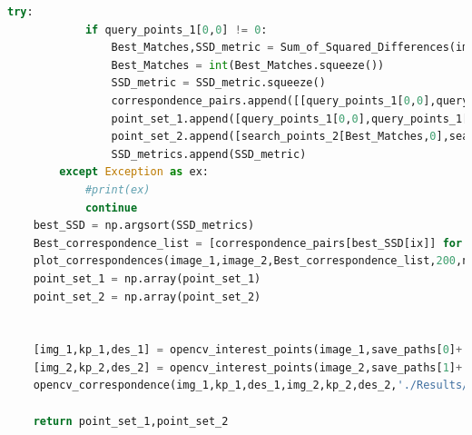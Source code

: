 \documentclass{article}
\begin{document}
\begin{lstlisting}[language=Python]
		try:
			if query_points_1[0,0] != 0:
				Best_Matches,SSD_metric = Sum_of_Squared_Differences(image_1,image_2,query_points_1,search_points_2,40)
				Best_Matches = int(Best_Matches.squeeze())
				SSD_metric = SSD_metric.squeeze()
				correspondence_pairs.append([[query_points_1[0,0],query_points_1[0,1]],[search_points_2[Best_Matches,0],search_points_2[Best_Matches,1]]])
				point_set_1.append([query_points_1[0,0],query_points_1[0,1]])
				point_set_2.append([search_points_2[Best_Matches,0],search_points_2[Best_Matches,1]])
				SSD_metrics.append(SSD_metric)
		except Exception as ex:
			#print(ex)
			continue
	best_SSD = np.argsort(SSD_metrics)
	Best_correspondence_list = [correspondence_pairs[best_SSD[ix]] for ix in range(0,best_matching)]
	plot_correspondences(image_1,image_2,Best_correspondence_list,200,names[0].split('_')[0]+'_SSD_correspondence')
	point_set_1 = np.array(point_set_1)
	point_set_2 = np.array(point_set_2)


	[img_1,kp_1,des_1] = opencv_interest_points(image_1,save_paths[0]+'_opencv.png')
	[img_2,kp_2,des_2] = opencv_interest_points(image_2,save_paths[1]+'_opencv.png')
	opencv_correspondence(img_1,kp_1,des_1,img_2,kp_2,des_2,'./Results/',20)

	return point_set_1,point_set_2


\end{lstlisting}
\end{document}
